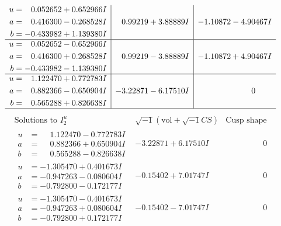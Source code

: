 \documentclass[1p]{elsarticle_modified}
\theoremstyle{definition}
\newcommand{\I}{\sqrt{-1}}
\begin{document}
$$\begin{array}{c|c|c}
\begin{aligned}
u &= \phantom{-}0.052652 + 0.652966 I \\
a &= \phantom{-}0.416300 - 0.268528 I \\
b &= -0.433982 + 1.139380 I\end{aligned}
 & \phantom{-}0.99219 + 3.88889 I & -1.10872 - 4.90467 I \\ \hline\begin{aligned}
u &= \phantom{-}0.052652 - 0.652966 I \\
a &= \phantom{-}0.416300 + 0.268528 I \\
b &= -0.433982 - 1.139380 I\end{aligned}
 & \phantom{-}0.99219 - 3.88889 I & -1.10872 + 4.90467 I \\ \hline\begin{aligned}
u &= \phantom{-}1.122470 + 0.772783 I \\
a &= \phantom{-}0.882366 - 0.650904 I \\
b &= \phantom{-}0.565288 + 0.826638 I\end{aligned}
 & -3.22871 - 6.17510 I & \phantom{-0.000000 } 0\\
 \hline 
 \end{array}$$\newpage$$\begin{array}{c|c|c}  
\text{Solutions to }I^u_{2}& \I (\text{vol} + \sqrt{-1}CS) & \text{Cusp shape}\\
 \hline 
\begin{aligned}
u &= \phantom{-}1.122470 - 0.772783 I \\
a &= \phantom{-}0.882366 + 0.650904 I \\
b &= \phantom{-}0.565288 - 0.826638 I\end{aligned}
 & -3.22871 + 6.17510 I & \phantom{-0.000000 } 0 \\ \hline\begin{aligned}
u &= -1.305470 + 0.401673 I \\
a &= -0.947263 - 0.080604 I \\
b &= -0.792800 - 0.172177 I\end{aligned}
 & -0.15402 + 7.01747 I & \phantom{-0.000000 } 0 \\ \hline\begin{aligned}
u &= -1.305470 - 0.401673 I \\
a &= -0.947263 + 0.080604 I \\
b &= -0.792800 + 0.172177 I\end{aligned}
 & -0.15402 - 7.01747 I & \phantom{-0.000000 } 0 \\ \hline\begin{aligned}

\end{aligned}
\end{array}$$
\end{document}
